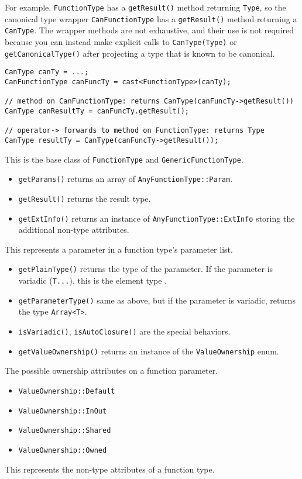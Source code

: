 \documentclass[../generics]{subfiles}
\begin{document}
For example, \texttt{FunctionType} has a \texttt{getResult()} method returning \texttt{Type}, so the canonical type wrapper \texttt{CanFunctionType} has a \texttt{getResult()} method returning a \texttt{CanType}. The wrapper methods are not exhaustive, and their use is not required because you can instead make explicit calls to \texttt{CanType(Type)} or \texttt{getCanonicalType()} after projecting a type that is known to be canonical.
\begin{Verbatim}
CanType canTy = ...;
CanFunctionType canFuncTy = cast<FunctionType>(canTy);

// method on CanFunctionType: returns CanType(canFuncTy->getResult())
CanType canResultTy = canFuncTy.getResult();

// operator-> forwards to method on FunctionType: returns Type
CanType resultTy = CanType(canFuncTy->getResult());
\end{Verbatim}

This is the base class of \texttt{FunctionType} and \texttt{GenericFunctionType}.
\begin{itemize}
\item \texttt{getParams()} returns an array of \texttt{AnyFunctionType::Param}.
\item \texttt{getResult()} returns the result type.
\item \texttt{getExtInfo()} returns an instance of \texttt{AnyFunctionType::ExtInfo} storing the additional non-type attributes.
\end{itemize}

This represents a parameter in a function type's parameter list.
\begin{itemize}
\item \texttt{getPlainType()} returns the type of the parameter. If the parameter is variadic (\texttt{T...}), this is the element type \tT.
\item \texttt{getParameterType()} same as above, but if the parameter is variadic, returns the type \texttt{Array<T>}.
\item \texttt{isVariadic()}, \texttt{isAutoClosure()} are the special behaviors.
\item \texttt{getValueOwnership()} returns an instance of the \texttt{ValueOwnership} enum.
\end{itemize}

The possible ownership attributes on a function parameter.
\begin{itemize}
\item \texttt{ValueOwnership::Default}
\item \texttt{ValueOwnership::InOut}
\item \texttt{ValueOwnership::Shared}
\item \texttt{ValueOwnership::Owned}
\end{itemize}

This represents the non-type attributes of a function type.
\end{document}
